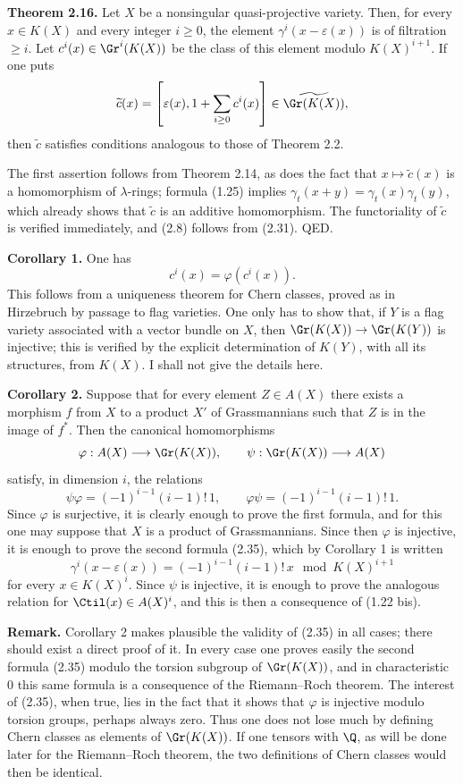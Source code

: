 \textbf{Theorem 2.16.} Let $X$ be a nonsingular quasi-projective variety. Then, for every $x\in K(X)$ and every integer $i\geq 0$, the element $\gamma^i(x-\varepsilon(x))$ is of filtration $\geq i$. Let $c^i(x)\in\Gr^i(K(X))$ be the class of this element modulo $K(X)^{i+1}$. If one puts
\[
 \widetilde c(x)=\left[\varepsilon(x),1+\sum_{i\geq 0}c^i(x)\right]\in \widetilde{\Gr(K(X))},
\]
then $\widetilde c$ satisfies conditions analogous to those of Theorem 2.2.

The first assertion follows from Theorem 2.14, as does the fact that $x\mapsto\widetilde c(x)$ is a homomorphism of $\lambda$-rings; formula (1.25) implies $\gamma_t(x+y)=\gamma_t(x)\gamma_t(y)$, which already shows that $\widetilde c$ is an additive homomorphism. The functoriality of $\widetilde c$ is verified immediately, and (2.8) follows from (2.31). QED.

\textbf{Corollary 1.} One has
\[
 c^i(x)=\varphi(c^i(x)).
\]
This follows from a uniqueness theorem for Chern classes, proved as in Hirzebruch by passage to flag varieties. One only has to show that, if $Y$ is a flag variety associated with a vector bundle on $X$, then $\Gr(K(X))\to\Gr(K(Y))$ is injective; this is verified by the explicit determination of $K(Y)$, with all its structures, from $K(X)$. I shall not give the details here.

\textbf{Corollary 2.} Suppose that for every element $Z\in A(X)$ there exists a morphism $f$ from $X$ to a product $X'$ of Grassmannians such that $Z$ is in the image of $f^*$. Then the canonical homomorphisms
\[
 \varphi:A(X)\longrightarrow \Gr(K(X)),\qquad
 \psi:\Gr(K(X))\longrightarrow A(X)
\]
satisfy, in dimension $i$, the relations
\begin{equation}\tag{2.35}
 \psi\varphi=(-1)^{i-1}(i-1)!\,1,
 \qquad
 \varphi\psi=(-1)^{i-1}(i-1)!\,1.
\end{equation}
Since $\varphi$ is surjective, it is clearly enough to prove the first formula, and for this one may suppose that $X$ is a product of Grassmannians. Since then $\varphi$ is injective, it is enough to prove the second formula (2.35), which by Corollary 1 is written
\[
 \gamma^i(x-\varepsilon(x))=(-1)^{i-1}(i-1)!\,x\mod K(X)^{i+1}
\]
for every $x\in K(X)^i$. Since $\psi$ is injective, it is enough to prove the analogous relation for $\Ctil(x)\in A(X)^i$, and this is then a consequence of (1.22 bis).

\textbf{Remark.} Corollary 2 makes plausible the validity of (2.35) in all cases; there should exist a direct proof of it. In every case one proves easily the second formula (2.35) modulo the torsion subgroup of $\Gr(K(X))$, and in characteristic $0$ this same formula is a consequence of the Riemann--Roch theorem. The interest of (2.35), when true, lies in the fact that it shows that $\varphi$ is injective modulo torsion groups, perhaps always zero. Thus one does not lose much by defining Chern classes as elements of $\Gr(K(X))$. If one tensors with $\Q$, as will be done later for the Riemann--Roch theorem, the two definitions of Chern classes would then be identical.

